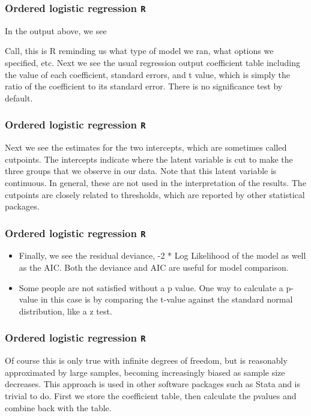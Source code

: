 \documentclass[00-GLMregslides.tex]{subfiles}
\begin{document}
\begin{frame}[fragile]
	\frametitle{Ordered logistic regression \texttt{R} }
	\Large
In the output above, we see

Call, this is R reminding us what type of model we ran, what options we specified, etc.
Next we see the usual regression output coefficient table including the value of each coefficient, standard errors, and t value, which is simply the ratio of the coefficient to its standard error. There is no significance test by default.
\end{frame}
\begin{frame}[fragile]
	\frametitle{Ordered logistic regression \texttt{R} }
	\Large
	
Next we see the estimates for the two intercepts, which are sometimes called cutpoints. The intercepts indicate where the latent variable is cut to make the three groups that we observe in our data. Note that this latent variable is continuous. In general, these are not used in the interpretation of the results. The cutpoints are closely related to thresholds, which are reported by other statistical packages.
\end{frame}
\begin{frame}[fragile]
	\frametitle{Ordered logistic regression \texttt{R} }
	\Large
\begin{itemize}
\item Finally, we see the residual deviance, -2 * Log Likelihood of the model as well as the AIC. Both the deviance and AIC are useful for model comparison.
\item Some people are not satisfied without a p value. One way to calculate a p-value in this case is by comparing the t-value against the standard normal distribution, like a z test. 
\end{itemize}
\end{frame}
\begin{frame}[fragile]
	\frametitle{Ordered logistic regression \texttt{R} }
	\Large
Of course this is only true with infinite degrees of freedom, but is reasonably approximated by large samples, becoming increasingly biased as sample size decreases. This approach is used in other software packages such as Stata and is trivial to do. First we store the coefficient table, then calculate the pvalues and combine back with the table.
\end{frame}
\end{document}
